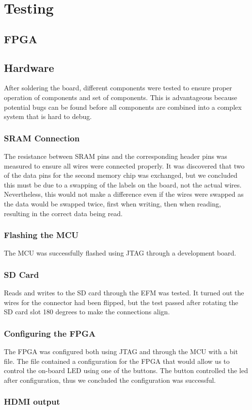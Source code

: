 \section{Testing}


\subsection{FPGA}


\subsection{Hardware}
After soldering the board, different components were tested to ensure proper operation of components and set of components.
This is advantageous because potential bugs can be found before all components are combined into a complex system that is hard to debug.

\subsubsection{SRAM Connection}
The resistance between SRAM pins and the corresponding header pins was measured to ensure all wires were connected properly.
It was discovered that two of the data pins for the second memory chip was exchanged, but we concluded this must be due to a swapping of the labels on the board, not the actual wires.
Nevertheless, this would not make a difference even if the wires were swapped as the data would be swapped twice, first when writing, then when reading, resulting in the correct data being read.

\subsubsection{Flashing the MCU}
The MCU was successfully flashed using JTAG through a development board.

\subsubsection{SD Card}
Reads and writes to the SD card through the EFM was tested. It turned out the wires for the connector had been flipped, but the test passed after rotating the SD card slot 180 degrees to make the connections align.

\subsubsection{Configuring the FPGA}
The FPGA was configured both using JTAG and through the MCU with a bit file. The file contained a configuration for the FPGA that would allow us to control the on-board LED using one of the buttons. The button controlled the led after configuration, thus we concluded the configuration was successful.

\subsubsection{HDMI output}
